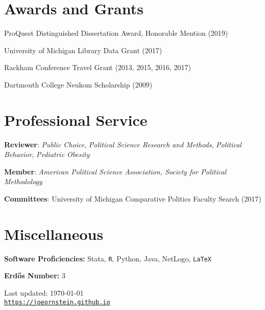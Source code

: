 \documentclass[letterpaper]{article}
\def\footerlink{https://joeornstein.github.io}
\renewenvironment{itemize}{
  \begin{list}{}{
    \setlength{\leftmargin}{1.5em}
  }
}{
  \end{list}
}
\begin{document}
\hrulefill

\section*{Awards and Grants}
\begin{itemize}
\item ProQuest Distinguished Dissertation Award, Honorable Mention (2019)
\item University of Michigan Library Data Grant (2017)
\item Rackham Conference Travel Grant (2013, 2015, 2016, 2017)
\item Dartmouth College Neukom Scholarship (2009)
\end{itemize}

\hrulefill

\section*{Professional Service}

\begin{itemize}
\item \textbf{Reviewer}: \textit{Public Choice}, \textit{Political Science Research and Methods}, \textit{Political Behavior}, \textit{Pediatric Obesity}
\item \textbf{Member}: \textit{American Political Science Association, Society for Political Methodology}
\item \textbf{Committees}: University of Michigan Comparative Politics Faculty Search (2017)
\end{itemize}

\hrulefill

\section*{Miscellaneous}
\begin{itemize}
\item \textbf{Software Proficiencies:} Stata, {\tt R}, Python, Java, NetLogo, {\tt LaTeX}
\item \textbf{Erd\H{o}s Number:} 3
\end{itemize}

\bigskip

\begin{center}
  \begin{footnotesize}
    Last updated: \today \\
    \href{\footerlink}{\texttt{\footerlink}}
  \end{footnotesize}
\end{center}
\end{document}
